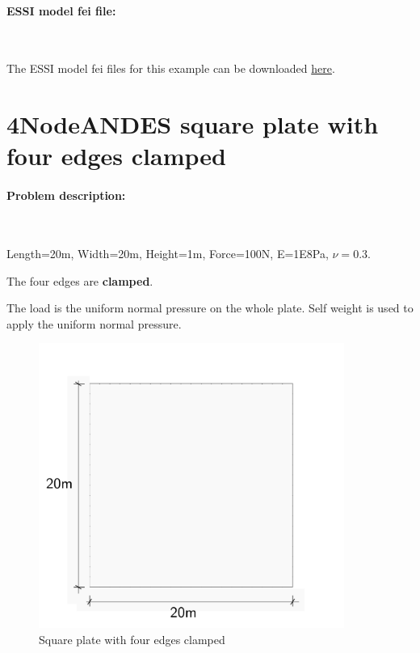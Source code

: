 \documentclass[fleqn,11pt]{article}
\begin{document}
\paragraph{ESSI model fei file: } ~




The ESSI model fei files for this example can be downloaded \href{https://github.com/yuan-energy/Real-ESSI-Examples/blob/master/model_fei_file/27NodeBrick_dynamic_impose_motion/27NodeBrick_dynamic_impose_motion.tgz?raw=true}{here}.











\newpage
\section{4NodeANDES square plate with four edges clamped}



\paragraph{Problem description:} ~



Length=20m, Width=20m, Height=1m, Force=100N, E=1E8Pa, $\nu=0.3$. 

The four edges are \textbf{clamped}. 

The load is the uniform normal pressure on the whole plate. Self weight is used to apply the uniform normal pressure. 


\begin{figure}[H]
  \centering
  \includegraphics[width=10cm]{../Figure-files/square_plate_descrp.pdf}
  \caption{Square plate with four edges clamped }
  \label{fig 4NodeANDES edges clamped square plate with element side length for program description }
\end{figure}
\end{document}
